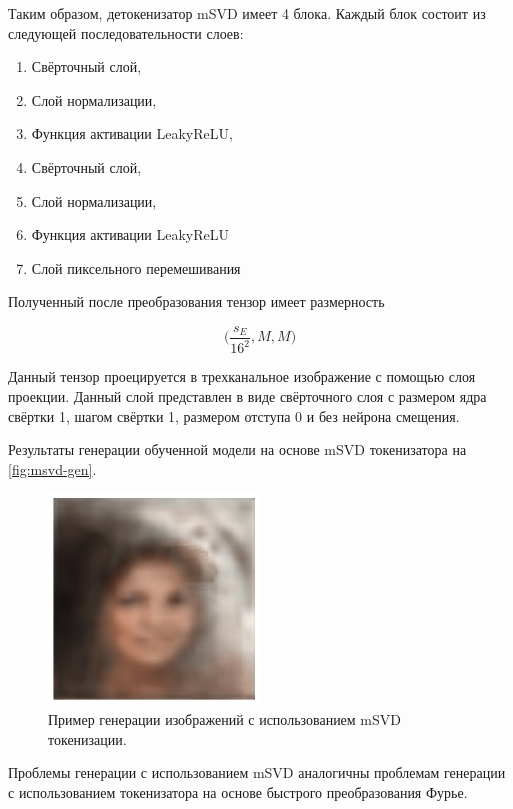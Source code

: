 Таким образом, детокенизатор mSVD имеет 4 блока. Каждый блок состоит из следующей последовательности слоев:

\begin{enumerate}
    \item Свёрточный слой,
    \item Слой нормализации,
    \item Функция активации LeakyReLU,
    \item Свёрточный слой,
    \item Слой нормализации,
    \item Функция активации LeakyReLU
    \item Слой пиксельного перемешивания
\end{enumerate}

Полученный после преобразования тензор имеет размерность 

$$
\Big(\dfrac{s_E}{16^2},  M, M\Big)
$$

Данный тензор проецируется в трехканальное изображение с помощью слоя проекции. Данный слой представлен в виде свёрточного слоя с размером ядра свёртки 1, шагом свёртки 1, размером отступа 0 и без нейрона смещения. 


Результаты генерации обученной модели на основе mSVD токенизатора на \autoref{fig:msvd-gen}.

\begin{figure}[H]
    \centering
    \includegraphics[width=0.5\textwidth]
    {images/generation/msvd_gen1.png}
    \caption{Пример генерации изображений с использованием mSVD токенизации.}
    \label{fig:msvd-gen}
\end{figure}

Проблемы генерации с использованием mSVD аналогичны проблемам генерации с использованием токенизатора на основе быстрого преобразования Фурье. 


